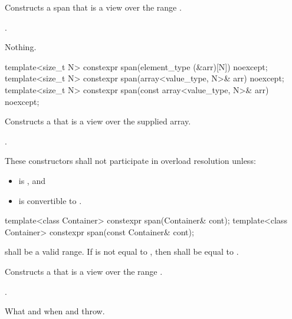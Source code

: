 \begin{codeblock}
\begin{codeblock}
\begin{codeblock}
\begin{itemdescr}
\pnum
\effects
Constructs a span that is a view over the range .

\pnum
\ensures
{}.

\pnum
\throws
Nothing.
\end{itemdescr}

%
\begin{itemdecl}
template<size_t N> constexpr span(element_type (&arr)[N]) noexcept;
template<size_t N> constexpr span(array<value_type, N>& arr) noexcept;
template<size_t N> constexpr span(const array<value_type, N>& arr) noexcept;
\end{itemdecl}
\begin{itemdescr}
\pnum
\effects
Constructs a  that is a view over the supplied array.

\pnum
\ensures
{}.

\pnum
\remarks
These constructors shall not participate in overload resolution unless:
\begin{itemize}
\item {} is , and
\item {} is convertible to .
\end{itemize}
\end{itemdescr}

%
\begin{itemdecl}
template<class Container> constexpr span(Container& cont);
template<class Container> constexpr span(const Container& cont);
\end{itemdecl}
\begin{itemdescr}
\pnum
\requires
{} shall be a valid range.
If  is not equal to ,
then  shall be equal to .

\pnum
\effects
Constructs a  that is a view over the range .

\pnum
\ensures
{}.

\pnum
\throws
What and when  and  throw.


\end{itemdescr}
\end{codeblock}
\end{codeblock}
\end{codeblock}
